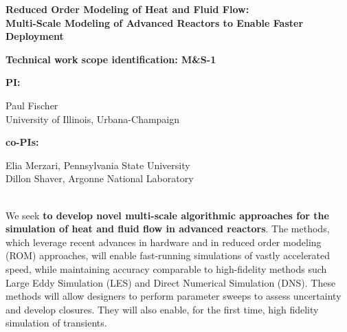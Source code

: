 \parindent 0in
\parskip 0.1in

\begin{center}
{\bf Reduced Order Modeling of Heat and Fluid Flow: \\
Multi-Scale Modeling of Advanced Reactors to Enable Faster Deployment}
\\[-7ex]
\end{center}

{\bf Technical work scope identification: M\&S-1 }

{\bf PI: }\begin{minipage}[t]{2.8in}
Paul Fischer \\
University of Illinois, Urbana-Champaign 
\end{minipage}
{\bf co-PIs: } \begin{minipage}[t]{3in}
Elia Merzari, Pennsylvania State University \\
Dillon Shaver, Argonne National Laboratory \\[-1ex]
\end{minipage}

 \\[-4ex]


We seek \textbf{to develop novel multi-scale algorithmic approaches for the
simulation of heat and fluid flow in advanced reactors}. The methods, which
leverage recent advances in hardware and in reduced order modeling (ROM)
approaches, will enable fast-running simulations of vastly accelerated speed,
while maintaining accuracy comparable to high-fidelity methods such Large Eddy
Simulation (LES) and Direct Numerical Simulation (DNS). These methods will
allow designers to perform
parameter sweeps to assess uncertainty and develop closures. They will also
enable, for the first time, high fidelity simulation of transients.


